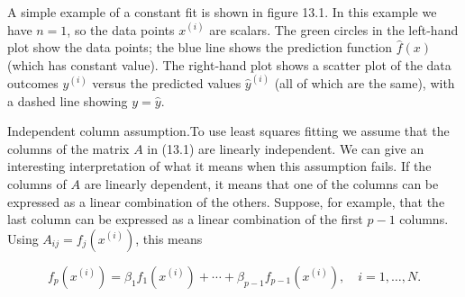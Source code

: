A simple example of a constant fit is shown in figure 13.1. In this example we have \(n=1\), so the data points \(x^{(i)}\) are scalars. The green circles in the left-hand plot show the data points; the blue line shows the prediction function \(\hat{f}(x)\) (which has constant value). The right-hand plot shows a scatter plot of the data outcomes \(y^{(i)}\) versus the predicted values \(\hat{y}^{(i)}\) (all of which are the same), with a dashed line showing \(y=\hat{y}\).

Independent column assumption.To use least squares fitting we assume that the columns of the matrix \(A\) in (13.1) are linearly independent. We can give an interesting interpretation of what it means when this assumption fails. If the columns of \(A\) are linearly dependent, it means that one of the columns can be expressed as a linear combination of the others. Suppose, for example, that the last column can be expressed as a linear combination of the first \(p-1\) columns. Using \(A_{ij}=f_{j}(x^{(i)})\), this means

\[f_{p}(x^{(i)})=\beta_{1}f_{1}(x^{(i)})+\cdots+\beta_{p-1}f_{p-1}(x^{(i)}),\quad i =1,\ldots,N.\] 